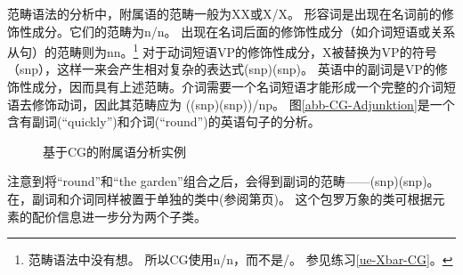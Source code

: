 范畴语法的分析中，附属语的范畴一般为X\bs X或X/X。
形容词是出现在名词前的修饰性成分。它们的范畴为n/n。
出现在名词后面的修饰性成分（如介词短语或关系从句）的范畴则为n\bs n。\footnote{
  范畴语法中没有想。
  所以CG使用n/n，而不是\nbar/\nbar。
  参见练习\ref{ue-Xbar-CG}。
} 
对于动词短语VP的修饰性成分，X被替换为VP的符号（s\bs np），这样一来会产生相对复杂的表达式(s\bs np)\bs (s\bs np)。
英语中的副词是VP的修饰性成分，因而具有上述范畴。介词需要一个名词短语才能形成一个完整的介词短语去修饰动词，因此其范畴应为
((s\bs np)\bs (s\bs np))/np。
图\vref{abb-CG-Adjunktion}是一个含有副词(``{quickly}'')和介词(``{round}'')的英语句子的分析。
%
\begin{figure}
\caption{\label{abb-CG-Adjunktion}基于CG的附属语分析实例}
\end{figure}%
注意到将``round''和``the garden''组合之后，会得到副词的范畴——(s\bs np)\bs (s\bs np)。
在，副词和介词同样被置于单独的类中(参阅第\pageref{Seite-Adverbien-PP}页)。
这个包罗万象的类可根据元素的配价信息进一步分为两个子类。

